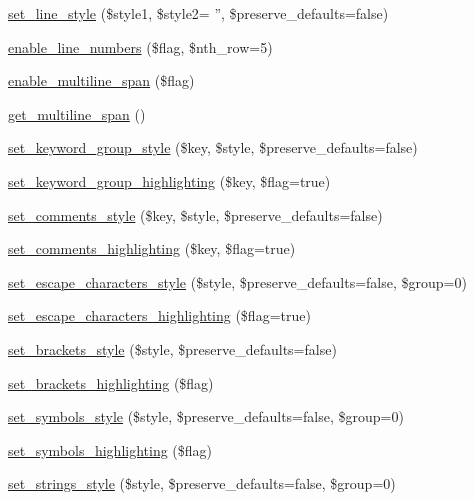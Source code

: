 \begin{DoxyCompactItemize}
\item 
\hyperlink{class_ge_s_hi_aa9586f685747c106b159794d16522b92}{set\-\_\-line\-\_\-style} (\$style1, \$style2= '', \$preserve\-\_\-defaults=false)
\item 
\hyperlink{class_ge_s_hi_a2bb9047a1b6c7548f80688cb437cf038}{enable\-\_\-line\-\_\-numbers} (\$flag, \$nth\-\_\-row=5)
\item 
\hyperlink{class_ge_s_hi_a035c04e0d4620b15ffb73b0a9ef4b36f}{enable\-\_\-multiline\-\_\-span} (\$flag)
\item 
\hyperlink{class_ge_s_hi_a9c51999881acf1eebc179350f0c72046}{get\-\_\-multiline\-\_\-span} ()
\item 
\hyperlink{class_ge_s_hi_aea02b209d3599348d69bb893bb74460e}{set\-\_\-keyword\-\_\-group\-\_\-style} (\$key, \$style, \$preserve\-\_\-defaults=false)
\item 
\hyperlink{class_ge_s_hi_a887fe064b4741767ce790878c6181f09}{set\-\_\-keyword\-\_\-group\-\_\-highlighting} (\$key, \$flag=true)
\item 
\hyperlink{class_ge_s_hi_ae0edb0af604f19e7ccacfe034e1ba9c1}{set\-\_\-comments\-\_\-style} (\$key, \$style, \$preserve\-\_\-defaults=false)
\item 
\hyperlink{class_ge_s_hi_ac14147abdfbdf5af3c72e80127cf0f6d}{set\-\_\-comments\-\_\-highlighting} (\$key, \$flag=true)
\item 
\hyperlink{class_ge_s_hi_aeef6c874be8a7d1fc66cfaf0f180c4d9}{set\-\_\-escape\-\_\-characters\-\_\-style} (\$style, \$preserve\-\_\-defaults=false, \$group=0)
\item 
\hyperlink{class_ge_s_hi_ab587206e070ca4500622aaaecabeff78}{set\-\_\-escape\-\_\-characters\-\_\-highlighting} (\$flag=true)
\item 
\hyperlink{class_ge_s_hi_adc1c16422680fa5b058b8301a44dd9a1}{set\-\_\-brackets\-\_\-style} (\$style, \$preserve\-\_\-defaults=false)
\item 
\hyperlink{class_ge_s_hi_a58958425c4992595ecc057cf5ccfc1d3}{set\-\_\-brackets\-\_\-highlighting} (\$flag)
\item 
\hyperlink{class_ge_s_hi_ab26232ef62830360484bf06b6f0140de}{set\-\_\-symbols\-\_\-style} (\$style, \$preserve\-\_\-defaults=false, \$group=0)
\item 
\hyperlink{class_ge_s_hi_ad679eb28054d7aef471315b76cad6071}{set\-\_\-symbols\-\_\-highlighting} (\$flag)
\item 
\hyperlink{class_ge_s_hi_a9ac1d1a9ce4c110ab4efcd080e6f23a6}{set\-\_\-strings\-\_\-style} (\$style, \$preserve\-\_\-defaults=false, \$group=0)

\end{DoxyCompactItemize}
